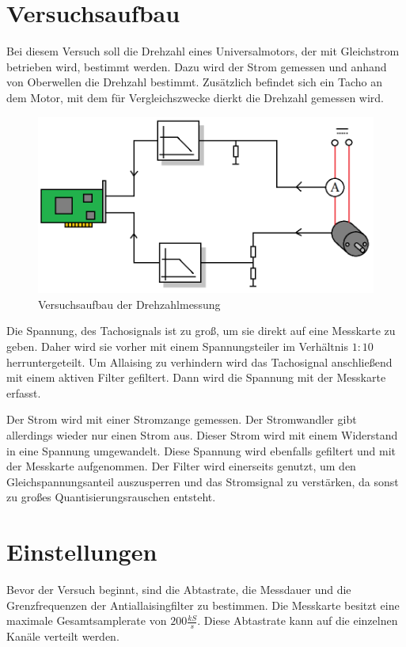 \documentclass{article}%
\begin{document}
\section{Versuchsaufbau}

	Bei diesem Versuch soll die Drehzahl eines Universalmotors, der mit Gleichstrom betrieben wird, 
	bestimmt werden. Dazu wird der Strom gemessen und anhand von Oberwellen die Drehzahl bestimmt. 
	Zusätzlich befindet sich ein Tacho an dem Motor, mit dem für Vergleichszwecke 
	dierkt die Drehzahl gemessen wird.


	\begin{figure}[htb]
	\centering
	\includegraphics[width=1\textwidth]{Versuchasaufbau.png}
	\caption{Versuchsaufbau der Drehzahlmessung}
	\end{figure}

	
	Die Spannung, des Tachosignals ist zu groß, um sie direkt auf eine Messkarte zu geben. 
	Daher wird sie vorher mit einem Spannungsteiler im Verhältnis $1:10$
	herruntergeteilt. Um Allaising zu verhindern wird das Tachosignal anschließend mit 
	einem aktiven Filter gefiltert. Dann wird die Spannung mit der Messkarte erfasst.
	

	Der Strom wird mit einer Stromzange gemessen. Der Stromwandler gibt allerdings wieder 
	nur einen Strom aus. Dieser Strom wird mit einem Widerstand in eine Spannung umgewandelt. 
	Diese Spannung wird ebenfalls gefiltert und mit der 
	Messkarte aufgenommen. Der Filter wird einerseits genutzt, um den Gleichspannungsanteil 
	auszusperren und das Stromsignal zu verstärken, da sonst zu großes Quantisierungsrauschen entsteht.


\section{Einstellungen}

	Bevor der Versuch beginnt, sind die Abtastrate, die Messdauer und die
	Grenzfrequenzen der Antiallaisingfilter zu bestimmen. Die Messkarte besitzt eine maximale 
	Gesamtsamplerate von $200\frac{kS}{s}$. Diese Abtastrate kann auf die einzelnen
	Kanäle verteilt werden.
\end{document}
